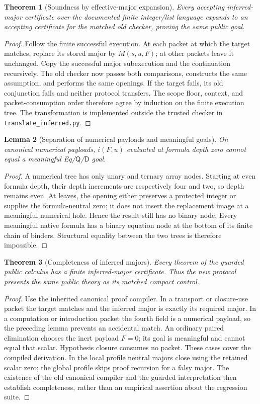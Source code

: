 \documentclass[11pt,letterpaper]{article}
\newtheorem{theorem}{Theorem}[section]
\newtheorem{lemma}[theorem]{Lemma}
\theoremstyle{definition}
\newcommand{\D}{\mathsf D}
\newcommand{\Q}{\mathsf Q}
\begin{document}
\begin{theorem}[Soundness by effective-major expansion]
Every accepting inferred-major certificate over the documented finite
integer/list language expands to an accepting certificate for the matched
old checker, proving the same public goal.
\end{theorem}
\begin{proof}
Follow the finite successful execution. At each packet at which the target
matches, replace its stored major by $M(s,u,F)$; at other packets leave it
unchanged. Copy the successful major subexecution and the continuation
recursively. The old checker now passes both comparisons, constructs the
same assumption, and performs the same openings. If the target fails, its
old conjunction fails and neither protocol transfers. The scope floor,
context, and packet-consumption order therefore agree by induction on the
finite execution tree. The transformation is implemented outside the
trusted checker in \texttt{translate\_inferred.py}.
\end{proof}

\begin{lemma}[Separation of numerical payloads and meaningful goals]
On canonical numerical payloads, $i(F,u)$ evaluated at formula depth zero
cannot equal a meaningful Eq/$\Q$/$\D$ goal.
\end{lemma}
\begin{proof}
A numerical tree has only unary and ternary array nodes. Starting at even
formula depth, their depth increments are respectively four and two, so
depth remains even. At leaves, the opening either preserves a protected
integer or supplies the formula-neutral zero; it does not insert the
replacement image at a meaningful numerical hole. Hence the result still
has no binary node. Every meaningful native formula has a binary equation
node at the bottom of its finite chain of binders. Structural equality
between the two trees is therefore impossible.
\end{proof}

\begin{theorem}[Completeness of inferred majors]
Every theorem of the guarded public calculus has a finite inferred-major
certificate. Thus the new protocol presents the same public theory as its
matched compact control.
\end{theorem}
\begin{proof}
Use the inherited canonical proof compiler. In a transport or closure-use
packet the target matches and the inferred major is exactly its required
major. In a computation or introduction packet the fourth field is a
numerical payload, so the preceding lemma prevents an accidental match.
An ordinary paired elimination chooses the inert payload $F=0$; its goal
is meaningful and cannot equal that scalar. Hypothesis closure consumes no
packet. These cases cover the compiled derivation. In the local profile
neutral majors close using the retained scalar zero; the global profile
skips proof recursion for a falsy major. The existence of the old canonical
compiler and the guarded interpretation
then establish completeness, rather than an empirical assertion about
the regression suite.
\end{proof}
\end{document}
